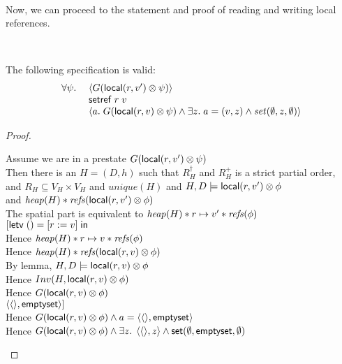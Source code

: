 \ \\

\noindent Now, we can proceed to the statement and proof of reading and writing
local references. 

\ \\


\begin{prop*}
The following specification is valid:
\begin{displaymath}
\begin{array}{ll}
\forall \psi.\; 
  &    \left<G(\mathsf{local}({r}, {v'}) \otimes \psi)\right> \\
  &    \mathsf{setref}\; r\;v \\
  &    \left<a.\; G(\mathsf{local}({r}, {v}) \otimes \psi) 
                  \land  \exists z.\;a = (v,z) \land \mathit{set}(\emptyset, z, \emptyset)
       \right> 
\end{array}
\end{displaymath}
\end{prop*}

\begin{proof}
\begin{tabbedproof}
\oo Assume we are in a prestate $G(\mathsf{local}({r}, {v'}) \otimes \psi)$ \\
\oo Then there is an $H = (D,h)$ such that $R^\dagger_H$ and  $R^+_H$ is a strict partial order, \\
\oo and $R_H \subseteq V_H \times V_H$ and $\mathit{unique}(H)$ and $H, D \models \mathsf{local}({r}, {v'}) \otimes \phi$ \\
\oo and $\mathit{heap}(H) * \mathit{refs}(\mathsf{local}({r}, {v'}) \otimes \phi)$\\
\oo The spatial part is equivalent to $\mathit{heap}(H) * r \mapsto v' * \mathit{refs}(\phi)$ \\
\oo $[\mathsf{letv}\;() = [r := v]\;\mathsf{in}\;$ \\
\oo Hence $\mathit{heap}(H) * r \mapsto v * \mathit{refs}(\phi)$ \\
\oo Hence $\mathit{heap}(H) * \mathit{refs}(\mathsf{local}({r}, {v}) \otimes \phi)$ \\
\oo By lemma, $H, D \models \mathsf{local}({r}, {v}) \otimes \phi$ \\
\oo Hence $Inv(H, \mathsf{local}({r}, {v}) \otimes \phi)$ \\
\oo Hence $G(\mathsf{local}({r}, {v}) \otimes \phi)$ \\
\oo $\left<{\left<\right>},{\mathsf{emptyset}}\right>]$ \\
\oo Hence $G(\mathsf{local}({r}, {v}) \otimes \phi) \land a = \left<{\left<\right>},{\mathsf{emptyset}}\right>$ \\
\oo Hence $G(\mathsf{local}({r}, {v}) \otimes \phi) \land \exists z.\; \left<{\left<\right>},{z}\right> \land \mathsf{set}(\emptyset, \mathsf{emptyset}, \emptyset)$ \\
\end{tabbedproof}
\end{proof}


